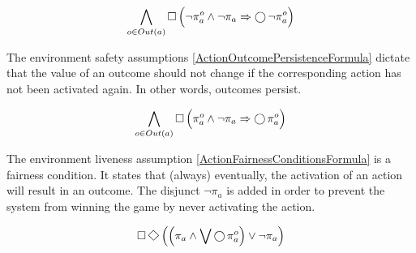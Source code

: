 \begin{equation}\label{ActionOutcomeConstraintFormula}
	\bigwedge \limits_{o \in Out(a)} \operatorname{\Box} \Big( \lnot \pi_a^o \wedge \lnot \pi_a \Rightarrow \operatorname{\bigcirc} \lnot \pi_a^o \Big)
\end{equation}

The environment safety assumptions \eqref{ActionOutcomePersistenceFormula} dictate that the value of an outcome should not change if the corresponding action has not been activated again. 
In other words, outcomes persist.

\begin{equation}\label{ActionOutcomePersistenceFormula}
	\bigwedge \limits_{o \in Out(a)} \operatorname{\Box} \Big( \pi_a^o \wedge \lnot \pi_a \Rightarrow \operatorname{\bigcirc} \pi_a^o \Big)
\end{equation}

The environment liveness assumption \eqref{ActionFairnessConditionsFormula} is a fairness condition.
It states that (always) eventually, the activation of an action will result in an outcome.
The disjunct $\lnot \pi_a$ is added in order to prevent the system from winning the game by never activating the action.


\begin{equation}\label{ActionFairnessConditionsFormula}
	\LTLG \LTLF \Big( \Big( \pi_a \wedge \bigvee \LTLX \pi_a^o \Big) \vee \lnot \pi_a \Big)
\end{equation}

